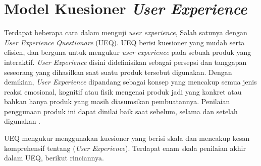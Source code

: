 \section{Model Kuesioner \emph{User Experience}}
\label{sec:Model Kuesioner User Experience}
Terdapat beberapa cara dalam menguji \emph{user experience}, Salah satunya dengan \emph{User Experience Questionare} (UEQ). UEQ berisi kuesioner yang mudah serta efisien, dan berguna untuk mengukur \emph{user experience} pada sebuah produk yang interaktif. \emph{User Experience} disini didefinisikan sebagai persepsi dan tanggapan seseorang yang dihasilkan saat suatu produk tersebut digunakan. Dengan demikian, \emph{User Experience} dipandang sebagai konsep yang mencakup semua jenis reaksi emosional, kognitif atau fisik mengenai produk jadi yang konkret atau bahkan hanya produk yang masih diasumsikan pembuatannya. Penilaian penggunaan produk ini dapat dinilai baik saat sebelum, selama dan setelah digunakan \parencite{AndreasHinderks}. 

UEQ mengukur menggunakan kuesioner yang berisi skala dan mencakup kesan komprehensif tentang (\emph{User Experience}). Terdapat enam skala penilaian akhir dalam UEQ, berikut rinciannya.

